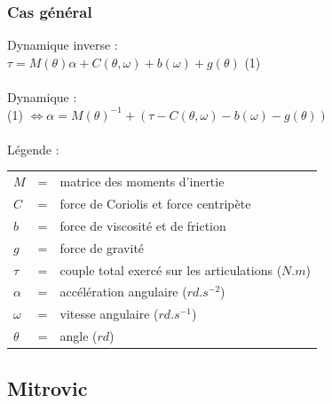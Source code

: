 \documentclass{beamer}
\begin{document}
\begin{frame}
\frametitle{Cas général}
Dynamique inverse : \\
$\tau = M(\theta)\alpha + C(\theta, \omega) + b(\omega) + g(\theta) $ (1)\\
~\\
Dynamique :\\
(1) $\Leftrightarrow \alpha = M(\theta)^{-1} + (\tau - C(\theta, \omega) - b(\omega) - g(\theta)) $ \\
~\\
Légende : \\
\begin{tabular}{lcl}
    $M$      & = & matrice des moments d'inertie \\ %
    $C$      & = & force de Coriolis et force centripète \\
    $b$      & = & force de viscosité et de friction \\ %
    $g$      & = & force de gravité \\
    $\tau$   & = & couple total exercé sur les articulations ($N.m$) \\
    $\alpha$ & = & accélération angulaire ($rd.s^{-2}$) \\
    $\omega$ & = & vitesse angulaire ($rd.s^{-1}$) \\
    $\theta$ & = & angle ($rd$) \\
\end{tabular}
\end{frame}


\subsection{Mitrovic}
\end{document}
